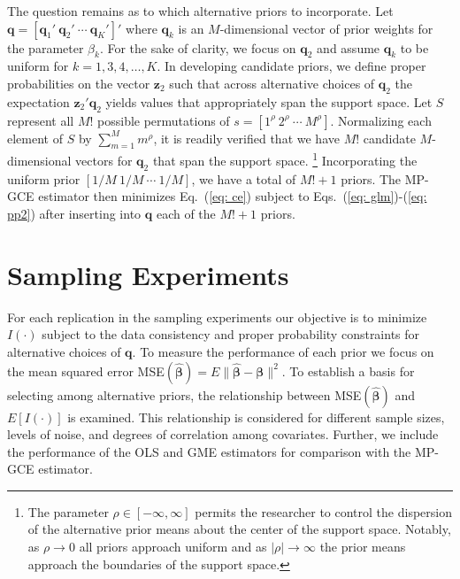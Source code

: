 \documentclass{elsarticle}
\begin{document}
The question remains as to which alternative priors to incorporate.
Let $\mathbf{q}=[\mathbf{q}_1' ~ \mathbf{q}_2' ~ \cdots ~ \mathbf{q}_K' ]'$ where
$\mathbf{q}_k$ is an $M$-dimensional vector of prior weights for the parameter 
$\beta_k$.
For the sake of clarity, we focus on $\mathbf{q}_2$ and assume $\mathbf{q}_k$ to 
be uniform for $k=1,3,4,\ldots, K$.
In developing candidate priors, we define proper probabilities on the vector 
$\mathbf{z}_2$ such that across alternative choices of $\mathbf{q}_2$ the 
expectation $\mathbf{z}_2'\mathbf{q}_2$  yields values that appropriately
span the support space. 
Let $S$ represent all  $M!$ possible permutations of 
$s = [1^\rho ~ 2^\rho ~ \cdots ~ M^\rho]$.
Normalizing each element of $S$ by $\sum_{m=1}^M m^\rho$, it is 
readily verified that we have $M!$ candidate $M$-dimensional vectors for 
$\mathbf{q}_2$ that span the support space.%
\footnote{The parameter $\rho \in [-\infty, \infty]$ permits the researcher
to control the dispersion of the alternative prior means about the center of the 
support space.
Notably, as $\rho \to 0$ all priors approach uniform and as $|\rho| \to 
\infty$ the prior means approach the boundaries of the support space.}
Incorporating the uniform prior $[1/M ~ 1/M ~ \cdots ~ 1/M]$, we have a total
of $M! + 1$ priors.
The MP-GCE estimator then minimizes Eq.\ (\ref{eq: ce}) subject 
to Eqs.\ (\ref{eq: glm})-(\ref{eq: pp2}) after inserting into $\mathbf{q}$ 
each of the $M! + 1$ priors.


\section{Sampling Experiments}
\label{sec: mce}

For each replication in the sampling experiments our objective is to minimize 
$I(\cdot)$ subject to the data consistency and proper probability constraints 
for alternative choices of $\mathbf{q}$. 
To measure the performance of each prior we focus on the mean squared 
error MSE$(\hat{\mathbf{\beta}}) = E \| \hat{\mathbf{\beta}}- 
\mathbf{\beta}\|^2$.
To establish a basis for selecting among alternative priors, the relationship 
between MSE$(\hat{\mathbf{\beta}})$ and $E[I(\cdot)]$ is examined.
This relationship is considered for different sample sizes, levels of noise, 
and degrees of correlation among covariates.
Further, we include the performance of the OLS and GME estimators for 
comparison with the MP-GCE estimator.
\end{document}
